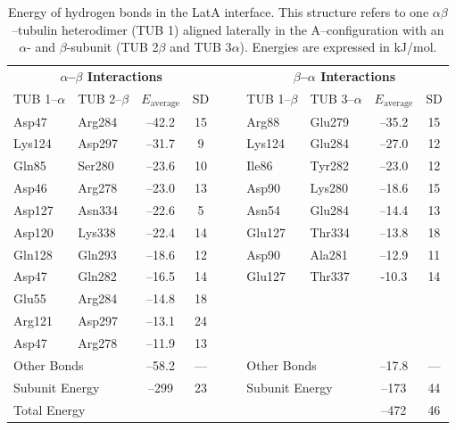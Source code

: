 \documentclass[11pt]{report}
\begin{document}
\begin{table}
  \caption[Energy of hydrogen bonds in the LatA interface]{Energy of hydrogen bonds in the LatA interface. 
  This structure refers to one $\alpha\beta$--tubulin 
  heterodimer (TUB 1) aligned laterally in the A--configuration
  with an $\alpha$- and $\beta$-subunit (TUB 2$\beta$ and 
  TUB 3$\alpha$). 
  Energies are expressed in kJ/mol.}
  \label{t:THB-LatA}
  \centering
  \begin{tabular*}{\linewidth}{@{\extracolsep{\fill}}llccccllcc}
    \toprule
    \multicolumn{4}{c}{\textbf{$\alpha$--$\beta$ Interactions}}&&&\multicolumn{4}{c}{\textbf{$\beta$--$\alpha$ Interactions}}\\
    \cmidrule(r){1-4} \cmidrule(l){7-10}
    TUB 1--$\alpha$&TUB 2--$\beta$&$E_{\text{average}}$&SD&&&TUB 1--$\beta$&TUB 3--$\alpha$&$E_{\text{average}}$&SD\\
    \midrule
    Asp47	&	  Arg284	&	--42.2	&	15	&&&	Arg88	&	  Glu279	&	--35.2	&	15	\\
    Lys124	&	  Asp297	&	--31.7	&	9	&&&	Lys124	&	  Glu284	&	--27.0	&	12	\\
    Gln85	&	  Ser280	&	--23.6	&	10	&&&	Ile86	&	  Tyr282	&	--23.0	&	12	\\
    Asp46	&	  Arg278	&	--23.0	&	13	&&&	Asp90	&	  Lys280	&	--18.6	&	15	\\
    Asp127	&	  Asn334	&	--22.6	&	5	&&&	Asn54	&	  Glu284	&	--14.4	&	13	\\
    Asp120	&	  Lys338	&	--22.4	&	14	&&&	Glu127	&	  Thr334	&	--13.8	&	18	\\
    Gln128	&	  Gln293	&	--18.6	&	12	&&&	Asp90	&	  Ala281	&	--12.9	&	11	\\
    Asp47	&	  Gln282	&	--16.5	&	14	&&&	Glu127  &         Thr337        &       -10.3   &	14      \\
    Glu55	&	  Arg284	&	--14.8	&	18	&&&     \\
    Arg121	&	  Asp297	&	--13.1	&	24	&&&&&&	\\
    Asp47	&	  Arg278	&	--11.9	&	13	&&&&&&	\\
    \multicolumn{2}{l}{{Other Bonds}}&--58.2&---&&&\multicolumn{2}{l}{{Other Bonds}}&--17.8&---\\
    \multicolumn{2}{l}{Subunit Energy}&--299&23&&&\multicolumn{2}{l}{Subunit Energy}&--173&44\\
    \multicolumn{8}{l}{Total Energy}&--472&46\\
    \bottomrule
  \end{tabular*} 
\end{table}
\end{document}
